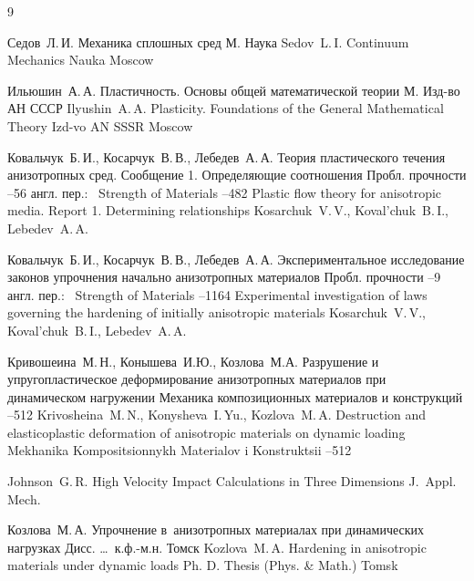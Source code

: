 \begin{thebibliography}{9}

\by Седов~Л.\,И.
\book Механика сплошных сред
\publaddr М.
\publ Наука
\misctransl
\by Sedov~L.\,I.
\book Continuum Mechanics 
\publ Nauka
\publaddr Moscow 


\by Ильюшин~А.\,А.
\book Пластичность. Основы общей математической теории
\publaddr М.
\publ Изд-во АН СССР
\misctransl
\by Ilyushin~A.\,A.
\book Plasticity. Foundations of the General Mathematical Theory
\publ Izd-vo AN SSSR
\publaddr Moscow 

\by Ковальчук~Б.\,И., Косарчук~В.\,В., Лебедев~А.\,А.
\paper Теория пластического течения анизотропных сред. Сообщение 1. Определяющие соотношения
\jour Пробл. прочности
--56
\transl англ. пер.:~
\jour Strength of Materials
--482
\paper Plastic flow theory for anisotropic media. Report 1. Determining relationships
\by Kosarchuk~V.\,V., Koval'chuk~B.\,I., Lebedev~A.\,A.



\by Ковальчук~Б.\,И., Косарчук~В.\,В., Лебедев~А.\,А.
\paper Экспериментальное исследование законов упрочнения начально анизотропных материалов
\jour Пробл. прочности
--9
\transl англ. пер.:~
\jour Strength of Materials
--1164
\paper Experimental investigation of laws governing the hardening of initially anisotropic materials
\by Kosarchuk~V.\,V., Koval'chuk~B.\,I., Lebedev~A.\,A.



\by Кривошеина~М.\,Н., Конышева~И.Ю., Козлова~М.А.
\paper Разрушение и упругопластическое деформирование анизотропных материалов при динамическом нагружении
\jour Механика композиционных материалов и конструкций
--512
\misctransl
\by Krivosheina~M.\,N., Konysheva~I.\,Yu., Kozlova~M.\,A.
\paper Destruction and elasticoplastic deformation of anisotropic materials on dynamic loading
\jour Mekhanika Kompositsionnykh Materialov i Konstruktsii
--512


\by Johnson~G.\,R.
\paper High Velocity Impact Calculations in Three Dimensions
\jour J.~Appl. Mech.




\by  Козлова~М.\,А. 
\thesis Упрочнение в~анизотропных материалах при динамических нагрузках
\thesisinfo Дисс. \dots\ к.ф.-м.н. \nofrills
\publaddr Томск
\misctransl
\by Kozlova~M.\,A.
\thesis Hardening in anisotropic materials under dynamic loads
\thesisinfo Ph. D. Thesis (Phys. \& Math.)
\publaddr Tomsk

\end{thebibliography}

\noindent
\hskip6.5cm \thedate \par\noindent
\hskip6.5cm\therevdate




\makeengtitlem

\newpage

%
